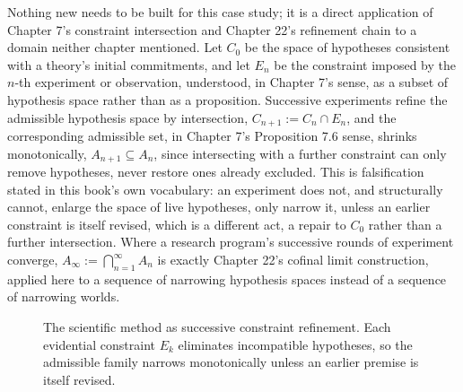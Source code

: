 \documentclass[11pt]{book}
\begin{document}
Nothing new needs to be built for this case study; it is a direct application of Chapter 7's constraint intersection and Chapter 22's refinement chain to a domain neither chapter mentioned. Let $C_0$ be the space of hypotheses consistent with a theory's initial commitments, and let $E_n$ be the constraint imposed by the $n$-th experiment or observation, understood, in Chapter 7's sense, as a subset of hypothesis space rather than as a proposition. Successive experiments refine the admissible hypothesis space by intersection, $C_{n+1} := C_n \cap E_n$, and the corresponding admissible set, in Chapter 7's Proposition 7.6 sense, shrinks monotonically, $A_{n+1} \subseteq A_n$, since intersecting with a further constraint can only remove hypotheses, never restore ones already excluded. This is falsification stated in this book's own vocabulary: an experiment does not, and structurally cannot, enlarge the space of live hypotheses, only narrow it, unless an earlier constraint is itself revised, which is a different act, a repair to $C_0$ rather than a further intersection. Where a research program's successive rounds of experiment converge, $A_\infty := \bigcap_{n=1}^\infty A_n$ is exactly Chapter 22's cofinal limit construction, applied here to a sequence of narrowing hypothesis spaces instead of a sequence of narrowing worlds.

\begin{figure}[htb]
\centering
{}
\caption{The scientific method as successive constraint refinement. Each evidential constraint $E_k$ eliminates incompatible hypotheses, so the admissible family narrows monotonically unless an earlier premise is itself revised.}
\label{fig:scientific-refinement}
\end{figure}
\end{document}
